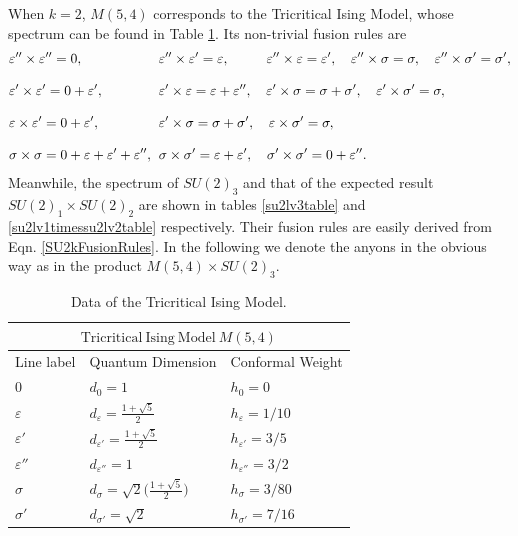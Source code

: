 \documentclass[11pt]{article}
\numberwithin{equation}{section}
\begin{document}
When $k=2$, $M(5,4)$ corresponds to the Tricritical Ising Model, whose spectrum can be found in Table \ref{tricritical}. Its non-trivial fusion rules are
\begin{align}
    & \varepsilon'' \times \varepsilon'' = 0, \quad \hspace{-0.5cm}&&\varepsilon'' \times \varepsilon' = \varepsilon, \quad \quad \hspace{0.25cm} \varepsilon'' \times \varepsilon = \varepsilon', \quad \varepsilon'' \times \sigma = \sigma, \quad \varepsilon'' \times \sigma' = \sigma', \\[0.3cm]
    &\varepsilon' \times \varepsilon' = 0 + \varepsilon', \quad
    \hspace{-0.5cm} &&\varepsilon' \times \varepsilon = \varepsilon + \varepsilon'', \quad
    \varepsilon' \times \sigma = \sigma + \sigma', \quad
    \varepsilon' \times \sigma' = \sigma,  \\[0.3cm]
    &\varepsilon \times \varepsilon' = 0 + \varepsilon', \quad
    \hspace{-0.5cm} &&\varepsilon' \times \sigma = \sigma + \sigma', \quad
    \varepsilon \times \sigma' = \sigma,  \\[0.3cm]
    &\sigma \times \sigma = 0 + \varepsilon + \varepsilon' + \varepsilon'', \quad
    \hspace{-0.5cm} &&\sigma \times \sigma' = \varepsilon + \varepsilon', \quad
    \sigma' \times \sigma' = 0 + \varepsilon''.
\end{align}
Meanwhile, the spectrum of $SU(2)_{3}$ and that of the expected result $SU(2)_{1} \times SU(2)_{2}$ are shown in tables \ref{su2lv3table} and \ref{su2lv1timessu2lv2table} respectively. Their fusion rules are easily derived from Eqn. \eqref{SU2kFusionRules}. In the following we denote the anyons in the obvious way as in the product $M(5,4) \times SU(2)_{3}$.

\begin{table}[t]
\centering
\begin{tabular}[h]{|p{4cm}|p{4cm}|p{4cm}| }
\hline 
\multicolumn{3}{|c|}{$\mathrm{Tricritical \ Ising \ Model} \ M(5,4)$} \\
\hline
Line label & Quantum Dimension & Conformal Weight  \\
\hline
0 & $d_{0} = 1$ & $h_{0} = 0$ \\
$\varepsilon$ & $d_{\varepsilon} = \frac{1+\sqrt{5}}{2}$ & $h_{\varepsilon} =  1/10$ \\
$\varepsilon'$ & $d_{\varepsilon'} = \frac{1+\sqrt{5}}{2}$ & $h_{\varepsilon'} = 3/5$ \\
$\varepsilon''$ & $d_{\varepsilon''} = 1$ & $h_{\varepsilon''} = 3/2$ \\
$\sigma$ & $d_{\sigma} = \sqrt{2} \big( \frac{1+\sqrt{5}}{2} \big)$ & $h_{\sigma} = 3/80$ \\
$\sigma'$ & $d_{\sigma'} = \sqrt{2}$ & $h_{\sigma'} = 7/16$ \\
\hline
\end{tabular}
\caption{Data of the Tricritical Ising Model.}  \label{tricritical}
\end{table}
\end{document}
